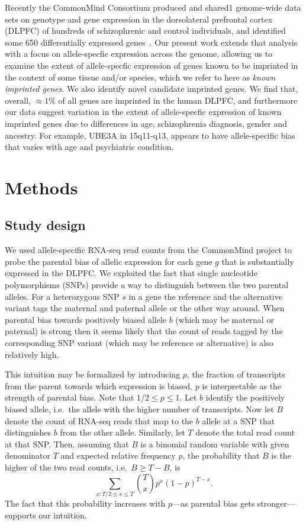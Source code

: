 \documentclass[letterpaper]{article}
\begin{document}
Recently the CommonMind Consortium produced and shared1 genome-wide data sets
on genotype and gene expression in the dorsolateral prefrontal cortex (DLPFC)
of hundreds of schizophrenic and control individuals, and identified some 650
differentially expressed genes~\cite{Fromer2016a}. Our present work extends
that analysis with a focus on allele-specfic expression across the genome,
allowing us to examine the extent of allele-specfic expression of genes known
to be imprinted in the context of some tissue and/or species, which we refer
to here as \emph{known imprinted genes}. We also identify novel candidate imprinted
genes.  We find that, overall,  \(\approx 1\%\) of all genes are imprinted
in the human DLPFC, and furthermore our data suggest variation in the extent
of allele-specfic expression of known imprinted genes due to differences in
age, schizophrenia diagnosis, gender and ancestry. For example, UBE3A in
15q11-q13, appears to have allele-specific bias that varies with age and
psychiatric condition. 

\section{Methods}

\subsection{Study design}

We used allele-specific RNA-seq read counts from the CommonMind project to
probe the parental bias of allelic expression for each gene \(g\) that is
substantially expressed in the DLPFC.  We exploited the fact that single
nucleotide polymorphisms (SNPs) provide a way to distinguish between the two
parental alleles.  For a heterozygous SNP \(s\) in a gene the reference and the
alternative variant tags the maternal and paternal allele or the other way
around.  When parental bias towards positively biased allele \(b\) (which may
be maternal or paternal) is strong then it seems likely that the count of
reads tagged by the corresponding SNP variant (which may be reference or
alternative) is also relatively high.

This intuition may be formalized by introducing \(p\), the fraction of
transcripts from the parent towards which expression is biased.  \(p\) is
interpretable as the strength of parental bias.  Note that \(1/2\le p\le 1\).
Let \(b\) identify the positively biased allele, i.e.~the allele with the
higher number of transcripts.  Now let \(B\) denote the count of RNA-seq reads
that map to the \(b\) allele at a SNP that distinguishes \(b\) from the other
allele.  Similarly, let \(T\) denote the total read count at that SNP.  Then,
assuming that \(B\) is a binomial random variable with given denominator \(T\)
and expected relative frequency \(p\), the probability that \(B\) is the
higher of the two read counts, i.e.~\(B \ge T - B\), is \[\sum_{x:T/2\le x\le
T} {T \choose x} p^x (1 - p)^{T-x}.\] The fact that this probability increases
with \(p\)---as parental bias gets stronger---supports our intuition.
\end{document}
